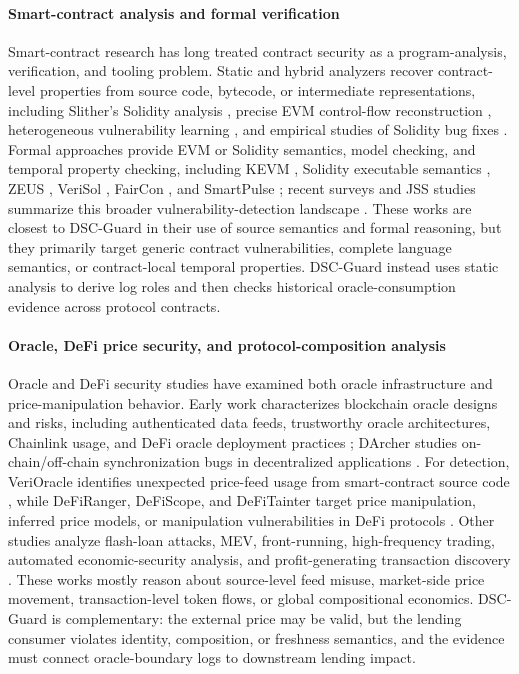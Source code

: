 \documentclass[final,5p]{elsarticle}
\newcommand{\tool}{DSC-Guard\xspace}
\begin{document}
\paragraph{Smart-contract analysis and formal verification}
Smart-contract research has long treated contract security as a program-analysis, verification, and tooling problem.
Static and hybrid analyzers recover contract-level properties from source code, bytecode, or intermediate representations, including Slither's Solidity analysis \cite{feist2019slither}, precise EVM control-flow reconstruction \cite{pasqua2023cfg}, heterogeneous vulnerability learning \cite{cai2024finegrained}, and empirical studies of Solidity bug fixes \cite{wang2023soliditybugfixes}.
Formal approaches provide EVM or Solidity semantics, model checking, and temporal property checking, including KEVM \cite{hildenbrandt2018kevm}, Solidity executable semantics \cite{jiao2020semantic}, ZEUS \cite{kalra2018zeus}, VeriSol \cite{wang2019formal}, FairCon \cite{liu2020towards}, and SmartPulse \cite{stephens2021smartpulse}; recent surveys and JSS studies summarize this broader vulnerability-detection landscape \cite{vidal2024slr,iuliano2026slr,soud2025soley,chang2026codespeak}.
These works are closest to \tool in their use of source semantics and formal reasoning, but they primarily target generic contract vulnerabilities, complete language semantics, or contract-local temporal properties.
\tool instead uses static analysis to derive log roles and then checks historical oracle-consumption evidence across protocol contracts.

\paragraph{Oracle, DeFi price security, and protocol-composition analysis}
Oracle and DeFi security studies have examined both oracle infrastructure and price-manipulation behavior.
Early work characterizes blockchain oracle designs and risks, including authenticated data feeds, trustworthy oracle architectures, Chainlink usage, and DeFi oracle deployment practices \cite{zhang2016town,al2020trustworthy,kaleem2021demystifying,liu2021first}; DArcher studies on-chain/off-chain synchronization bugs in decentralized applications \cite{zhang2021dharcher}.
For detection, VeriOracle identifies unexpected price-feed usage from smart-contract source code \cite{mo2023toward}, while DeFiRanger, DeFiScope, and DeFiTainter target price manipulation, inferred price models, or manipulation vulnerabilities in DeFi protocols \cite{wu2021defiranger,zhong2025defiscope,kong2023defitainter}.
Other studies analyze flash-loan attacks, MEV, front-running, high-frequency trading, automated economic-security analysis, and profit-generating transaction discovery \cite{qin2021attacking,daian2020flash,torres2021frontrunner,zhou2021high,babel2021clockwork,zhou2021just}.
These works mostly reason about source-level feed misuse, market-side price movement, transaction-level token flows, or global compositional economics.
\tool is complementary: the external price may be valid, but the lending consumer violates identity, composition, or freshness semantics, and the evidence must connect oracle-boundary logs to downstream lending impact.
\end{document}

